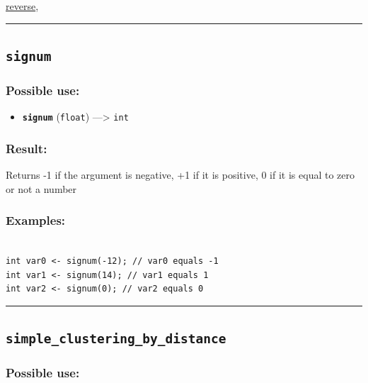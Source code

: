 \documentclass[]{book}
\providecommand{\tightlist}{%
  \setlength{\itemsep}{0pt}\setlength{\parskip}{0pt}}
\theoremstyle{definition}
\theoremstyle{definition}
\theoremstyle{definition}
\theoremstyle{remark}
\begin{document}
\href{operators-n-to-r.html\#reverse}{reverse},

\begin{center}\rule{0.5\linewidth}{\linethickness}\end{center}

\subsection{\texorpdfstring{\texttt{signum}}{signum}}\label{signum}

\subsubsection{Possible use:}\label{possible-use-472}

\begin{itemize}
\tightlist
\item
  \textbf{\texttt{signum}} (\texttt{float}) ---\textgreater{}
  \texttt{int}
\end{itemize}

\subsubsection{Result:}\label{result-456}

Returns -1 if the argument is negative, +1 if it is positive, 0 if it is
equal to zero or not a number

\subsubsection{Examples:}\label{examples-328}

\begin{verbatim}
 
int var0 <- signum(-12); // var0 equals -1 
int var1 <- signum(14); // var1 equals 1 
int var2 <- signum(0); // var2 equals 0
\end{verbatim}

\begin{center}\rule{0.5\linewidth}{\linethickness}\end{center}

\subsection{\texorpdfstring{\texttt{simple\_clustering\_by\_distance}}{simple\_clustering\_by\_distance}}\label{simple_clustering_by_distance}

\subsubsection{Possible use:}\label{possible-use-473}
\end{document}
